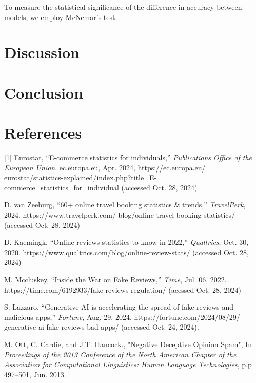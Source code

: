 \documentclass[a4paper,11pt]{article}
\begin{document}
To measure the statistical significance of the difference in accuracy between models, we employ McNemar's test.

\section{Discussion}

\section{Conclusion}

\section*{References}


[1] Eurostat, “E-commerce statistics for individuals,” \textit{Publications Office of the European Union}. ec.europa.eu, Apr. 2024, https://ec.europa.eu/
eurostat/statistics-explained/index.php?title=E-commerce\_statistics\_for\_individual 
(accessed Oct. 28, 2024)

\hfill

\noindent [2] D. van Zeeburg, “60+ online travel booking statistics \& trends,” \textit{TravelPerk}, 2024. https://www.travelperk.com/
blog/online-travel-booking-statistics/
(accessed Oct. 28, 2024)

\hfill

\noindent [3] D. Kaemingk, “Online reviews statistics to know in 2022,” \textit{Qualtrics}, Oct. 30, 2020. https://www.qualtrics.com/blog/online-review-stats/ (accessed Oct. 28, 2024)

\hfill

\noindent M. Mccluskey, “Inside the War on Fake Reviews,” \textit{Time}, Jul. 06, 2022. https://time.com/6192933/fake-reviews-regulation/ (acessed Oct. 28, 2024)

\hfill

\noindent [5] S. Lazzaro, “Generative AI is accelerating the spread of fake reviews and malicious apps,” \textit{Fortune}, Aug. 29, 2024. https://fortune.com/2024/08/29/
generative-ai-fake-reviews-bad-apps/ (accessed Oct. 24, 2024).

\hfill

\noindent [6] M. Ott, C. Cardie, and J.T. Hancock., "Negative Deceptive Opinion Spam", In \textit{Proceedings of the 2013 Conference of the North American Chapter of the Association for Computational Linguistics: Human Language Technologies}, p.p 497–501, Jun. 2013.  
\hfill
\end{document}
